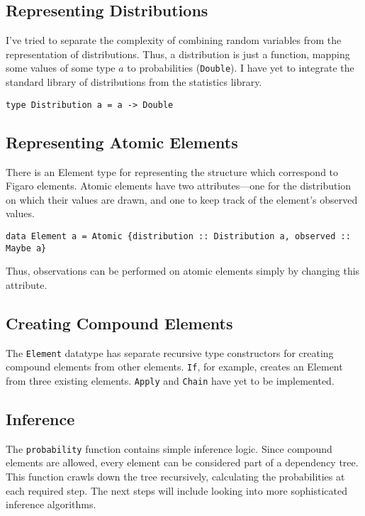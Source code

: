 \documentclass[12pt]{article}
\newcommand{\s}[1]{\texttt{#1}}
\begin{document}
\subsection{Representing Distributions}
I've tried to separate the complexity of combining random variables from
the representation of distributions. Thus, a distribution is just a function,
mapping some values of some type $a$ to probabilities (\s{Double}). I have yet
to integrate the standard library of distributions from the statistics library.
\begin{center}
  \s{type Distribution a = a -> Double}
\end{center}

\subsection{Representing Atomic Elements}
There is an Element type for representing the structure which correspond
to Figaro elements. Atomic elements have two attributes---one for the distribution
on which their values are drawn, and one to keep track of the element's observed
values.
\begin{center}
  \s{data Element a = Atomic \{distribution :: Distribution a, observed :: Maybe a\}}
\end{center}

Thus, observations can be performed on atomic elements simply by
changing this attribute.

\subsection{Creating Compound Elements}
The \s{Element} datatype has separate recursive type constructors for creating
compound elements from other elements. \s{If}, for example, creates an Element
from three existing elements. \s{Apply} and \s{Chain} have yet to be implemented.

\subsection{Inference}
The \s{probability} function contains simple inference logic. Since
compound elements are allowed, every element can be considered part of
a dependency tree. This function crawls down the tree recursively, calculating
the probabilities at each required step. The next steps will include looking
into more sophisticated inference algorithms.
\end{document}
